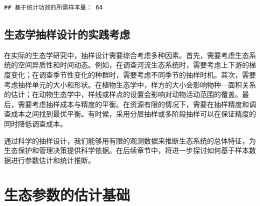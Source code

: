 \documentclass[
  twoside,12pt,fontset=none]{ctexbook}
\newenvironment{Shaded}{\begin{snugshade}}{\end{snugshade}}
\newcommand{\AttributeTok}[1]{\textcolor[rgb]{0.13,0.29,0.53}{#1}}
\newcommand{\CommentTok}[1]{\textcolor[rgb]{0.56,0.35,0.01}{\textit{#1}}}
\newcommand{\FloatTok}[1]{\textcolor[rgb]{0.00,0.00,0.81}{#1}}
\newcommand{\FunctionTok}[1]{\textcolor[rgb]{0.13,0.29,0.53}{\textbf{#1}}}
\newcommand{\NormalTok}[1]{#1}
\newcommand{\OtherTok}[1]{\textcolor[rgb]{0.56,0.35,0.01}{#1}}
\newcommand{\SpecialCharTok}[1]{\textcolor[rgb]{0.81,0.36,0.00}{\textbf{#1}}}
\newcommand{\StringTok}[1]{\textcolor[rgb]{0.31,0.60,0.02}{#1}}
\begin{document}
\begin{Shaded}
\end{Shaded}

\begin{verbatim}
## 基于统计功效的所需样本量： 64
\end{verbatim}

\hypertarget{ux751fux6001ux5b66ux62bdux6837ux8bbeux8ba1ux7684ux5b9eux8df5ux8003ux8651}{%
\subsection{生态学抽样设计的实践考虑}\label{ux751fux6001ux5b66ux62bdux6837ux8bbeux8ba1ux7684ux5b9eux8df5ux8003ux8651}}

在实际的生态学研究中，抽样设计需要综合考虑多种因素。首先，需要考虑生态系统的空间异质性和时间动态。例如，在调查河流生态系统时，需要考虑上下游的梯度变化；在调查季节性变化的种群时，需要考虑不同季节的抽样时机。其次，需要考虑抽样单元的大小和形状。在植物生态学中，样方的大小会影响物种---面积关系的估计；在动物生态学中，样线或样点的设置会影响对动物活动范围的覆盖。最后，需要考虑抽样成本与精度的平衡。在资源有限的情况下，需要在抽样精度和调查成本之间找到最优平衡。有时候，采用分层抽样或多阶段抽样可以在保证精度的同时降低调查成本。

通过科学的抽样设计，我们能够用有限的观测数据来推断生态系统的总体特征，为生态保护和管理决策提供科学依据。在后续章节中，将进一步探讨如何基于样本数据进行参数估计和统计推断。

\hypertarget{ux751fux6001ux53c2ux6570ux7684ux4f30ux8ba1ux57faux7840}{%
\section{生态参数的估计基础}\label{ux751fux6001ux53c2ux6570ux7684ux4f30ux8ba1ux57faux7840}}
\end{document}
